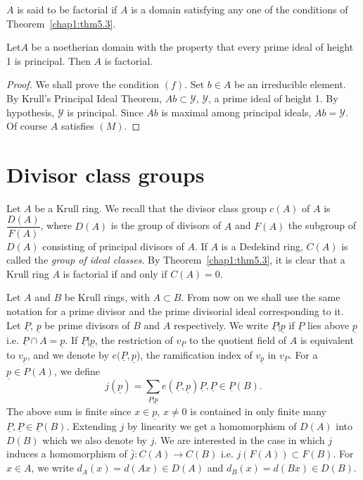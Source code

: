 \setcounter{definition}{3}
 \begin{definition} %
 $A$ is said to be factorial if $A$ is a domain satisfying any
   one of the conditions of Theorem~\ref{chap1:thm5.3}. 
 \end{definition} 
 
\setcounter{remark}{4}
 \begin{remark} %
Let\pageoriginale $A$ be a noetherian domain with the property that
every prime ideal of height 1 is principal. Then $A$ is factorial.  
 \end{remark} 
 
 \begin{proof} %
 We shall prove the condition $(f)$. Set $b \in A$ be an irreducible
 element. By Krull's Principal Ideal Theorem, $Ab \subset \mathscr{Y}$,
 $\mathscr{Y}$, a prime ideal of height 1. By hypothesis,
 $\mathscr{Y}$ is principal. Since $Ab$ is maximal among principal
 ideals, $Ab = \mathscr{Y}$. Of course $A$ satisfies $(M)$. 
 \end{proof} 

 
 \section{Divisor class groups}\label{chap1:sec6}%
 Let $A$ be a Krull ring. We recall that the divisor class group 
 $c(A)$ of $A$ is $\dfrac{D(A)}{F(A)}$, where $D(A)$ is the group of
 divisors of $A$ and $F(A)$ the subgroup of $D(A)$ consisting of
 principal divisors of $A$. If $A$ is a Dedekind ring, $C(A)$ is
 called the \textit{group of ideal classes}. By Theorem~\ref{chap1:thm5.3}, 
it is clear that a Krull ring $A$ is factorial if
 and only if $C(A) = 0$.  
  
  Let $A$ and $B$ be Krull rings, with $A \subset B$. From now on we
  shall use the same notation for a prime divisor and the prime
  divisorial ideal corresponding to it. Let $\underline{P}$,
  $\underline{p}$ be prime divisors of $B$ and $A$ respectively. We
  write $\underline{P}  \big| \underline{p}$ if $\underline{P}$ lies
  above $\underline{p}$  i.e. $\underline{P} \cap A =
  \underline{p}$. If $\underline{P} \big| \underline{p}$, the
  restriction of $v_{\underline{P}}$ to the 
  quotient field of $A$ is equivalent to $v_{\underline{p}}$, and we
  denote by $e(\underline{P} , \underline{p}$), the ramification index
  of $v_{\underline{p}}$ in $v_{\underline{P}}$. For a $\underline{p}
  \in P(A)$, we define 
$$
j(\underline{p}) = \sum\limits_{\underline{P} \big| \underline{p}}
e(\underline{P}, \underline{p}) \underline{P}, \underline{P} \in
\underline{P} (B).
$$
The above sum is finite since $x \in \underline{p}$, $x \neq 0$ is
  contained in only finite many $\underline{P}, \underline{P} \in
  \underline{P}(B)$. Extending $j$ by linearity we get a homomorphism
  of $D(A)$ into $D(B)$ which we also denote by $j$. We are
  interested\pageoriginale 
  in the case in which $j$ induces a homomorphism of $\bar{j}: C(A)
  \rightarrow C(B)$ i.e. $j (F (A)) \subset F(B)$. For $x \in A$, we
  write $d_A (x) = d (Ax) \in D(A) $ and $d_B(x) = d (Bx) \in D(B)$. 

